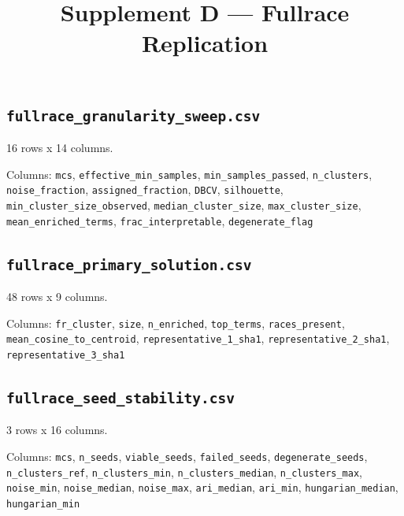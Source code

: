 \documentclass[10pt,a4paper]{article}
\title{\vspace{-14mm}\large Supplement D --- Fullrace Replication}
\author{}\date{}
\begin{document}
\maketitle\thispagestyle{fancy}
\subsection*{\texttt{fullrace\_\allowbreak{}granularity\_\allowbreak{}sweep.csv}}
16 rows x 14 columns.

{\raggedright Columns: \texttt{mcs}, \texttt{effective\_\allowbreak{}min\_\allowbreak{}samples}, \texttt{min\_\allowbreak{}samples\_\allowbreak{}passed}, \texttt{n\_\allowbreak{}clusters}, \texttt{noise\_\allowbreak{}fraction}, \texttt{assigned\_\allowbreak{}fraction}, \texttt{DBCV}, \texttt{silhouette}, \texttt{min\_\allowbreak{}cluster\_\allowbreak{}size\_\allowbreak{}observed}, \texttt{median\_\allowbreak{}cluster\_\allowbreak{}size}, \texttt{max\_\allowbreak{}cluster\_\allowbreak{}size}, \texttt{mean\_\allowbreak{}enriched\_\allowbreak{}terms}, \texttt{frac\_\allowbreak{}interpretable}, \texttt{degenerate\_\allowbreak{}flag}\par}

\subsection*{\texttt{fullrace\_\allowbreak{}primary\_\allowbreak{}solution.csv}}
48 rows x 9 columns.

{\raggedright Columns: \texttt{fr\_\allowbreak{}cluster}, \texttt{size}, \texttt{n\_\allowbreak{}enriched}, \texttt{top\_\allowbreak{}terms}, \texttt{races\_\allowbreak{}present}, \texttt{mean\_\allowbreak{}cosine\_\allowbreak{}to\_\allowbreak{}centroid}, \texttt{representative\_\allowbreak{}1\_\allowbreak{}sha1}, \texttt{representative\_\allowbreak{}2\_\allowbreak{}sha1}, \texttt{representative\_\allowbreak{}3\_\allowbreak{}sha1}\par}

\subsection*{\texttt{fullrace\_\allowbreak{}seed\_\allowbreak{}stability.csv}}
3 rows x 16 columns.

{\raggedright Columns: \texttt{mcs}, \texttt{n\_\allowbreak{}seeds}, \texttt{viable\_\allowbreak{}seeds}, \texttt{failed\_\allowbreak{}seeds}, \texttt{degenerate\_\allowbreak{}seeds}, \texttt{n\_\allowbreak{}clusters\_\allowbreak{}ref}, \texttt{n\_\allowbreak{}clusters\_\allowbreak{}min}, \texttt{n\_\allowbreak{}clusters\_\allowbreak{}median}, \texttt{n\_\allowbreak{}clusters\_\allowbreak{}max}, \texttt{noise\_\allowbreak{}min}, \texttt{noise\_\allowbreak{}median}, \texttt{noise\_\allowbreak{}max}, \texttt{ari\_\allowbreak{}median}, \texttt{ari\_\allowbreak{}min}, \texttt{hungarian\_\allowbreak{}median}, \texttt{hungarian\_\allowbreak{}min}\par}
\end{document}
